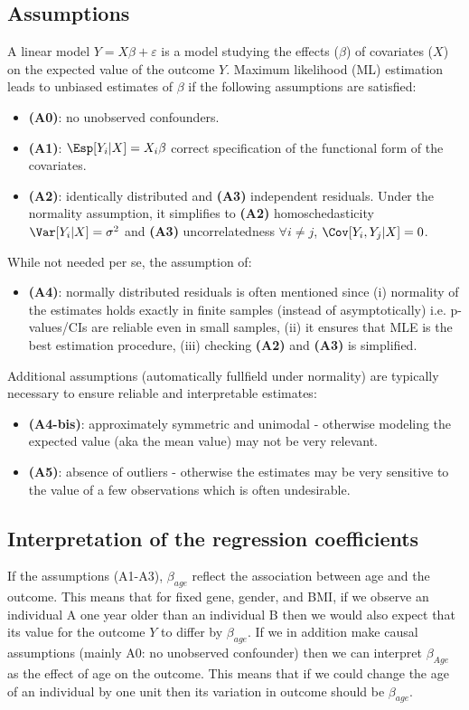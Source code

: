 \documentclass[12pt]{article}
\begin{document}
\subsection{Assumptions}
\label{sec:orgfb1c5eb}
A linear model \(Y = X \beta + \varepsilon\) is a model studying the
 effects (\(\beta\)) of covariates (\(X\)) on the expected value of
 the outcome \(Y\). Maximum likelihood (ML) estimation leads to
 unbiased estimates of \(\beta\) if the following assumptions are
 satisfied:
\begin{itemize}
\item \textbf{(A0)}: no unobserved confounders.
\item \textbf{(A1)}: \(\Esp[Y_i|X] = X_i \beta\) correct specification of the
functional form of the covariates.
\item \textbf{(A2)}: identically distributed and \textbf{(A3)} independent
residuals. \newline Under the normality assumption, it simplifies to
\textbf{(A2)} homoschedasticity \(\Var[Y_i|X]= \sigma^2\) and \textbf{(A3)}
uncorrelatedness \(\forall i \neq j\), \(\Cov[Y_i,Y_j|X]= 0\).
\end{itemize}
While not needed per se, the assumption of:
\begin{itemize}
\item \textbf{(A4)}: normally distributed residuals is often mentioned since (i)
normality of the estimates holds exactly in finite samples (instead
of asymptotically) i.e. p-values/CIs are reliable even in small
samples, (ii) it ensures that MLE is the best estimation procedure,
(iii) checking \textbf{(A2)} and \textbf{(A3)} is simplified.
\end{itemize}
Additional assumptions (automatically fullfield under normality) are
typically necessary to ensure reliable and interpretable estimates:
\begin{itemize}
\item \textbf{(A4-bis)}: approximately symmetric and unimodal - otherwise modeling the
expected value (aka the mean value) may not be very relevant.
\item \textbf{(A5)}: absence of outliers - otherwise the estimates may be very
sensitive to the value of a few observations which is often
undesirable.
\end{itemize}

\clearpage

\subsection{Interpretation of the regression coefficients}
\label{sec:interpretationLM}
If the assumptions (A1-A3), \(\beta_{age}\) reflect the association
between age and the outcome. This means that for fixed gene, gender,
and BMI, if we observe an individual A one year older than an
individual B then we would also expect that its value for the outcome
\(Y\) to differ by \(\beta_{age}\). \newline If we in addition make causal
assumptions (mainly A0: no unobserved confounder) then we can
interpret \(\beta_{Age}\) as the effect of age on the outcome. This
means that if we could change the age of an individual by one unit
then its variation in outcome should be \(\beta_{age}\).
\end{document}

